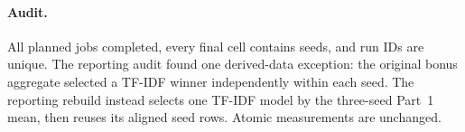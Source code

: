 \paragraph{Audit.}
All planned jobs completed, every final cell contains  seeds, and run IDs are unique. The reporting audit found one derived-data exception: the original bonus aggregate selected a TF-IDF winner independently within each seed. The reporting rebuild instead selects one TF-IDF model by the three-seed Part~1 mean, then reuses its aligned seed rows. Atomic measurements are unchanged.

